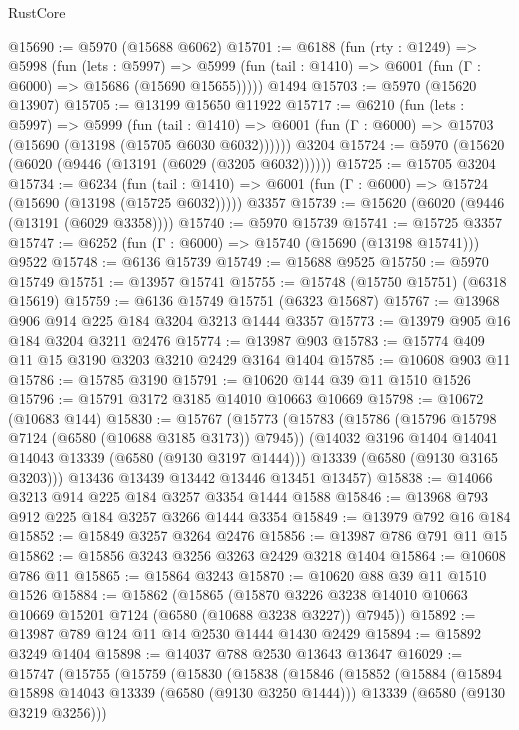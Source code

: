 \begin{lexlean}{RustCore}
\begin{coremodule}
{\begin{coremodule}
{{{{{{{{{{{{{{{{{{{{{{{{{{{{{{{{{{{{{{{{{{{{{@15690 := @5970 (@15688 @6062)
@15701 := @6188
    (fun (rty : @1249) =>
    @5998
      (fun (lets : @5997) =>
      @5999 (fun (tail : @1410) => @6001 (fun (Γ : @6000) => @15686 (@15690 @15655)))))
    @1494
@15703 := @5970 (@15620 @13907)
@15705 := @13199 @15650 @11922
@15717 := @6210
    (fun (lets : @5997) =>
    @5999
      (fun (tail : @1410) =>
      @6001 (fun (Γ : @6000) => @15703 (@15690 (@13198 (@15705 @6030 @6032))))))
    @3204
@15724 := @5970 (@15620 (@6020 (@9446 (@13191 (@6029 (@3205 @6032))))))
@15725 := @15705 @3204
@15734 := @6234
    (fun (tail : @1410) => @6001 (fun (Γ : @6000) => @15724 (@15690 (@13198 (@15725 @6032)))))
    @3357
@15739 := @15620 (@6020 (@9446 (@13191 (@6029 @3358))))
@15740 := @5970 @15739
@15741 := @15725 @3357
@15747 := @6252 (fun (Γ : @6000) => @15740 (@15690 (@13198 @15741))) @9522
@15748 := @6136 @15739
@15749 := @15688 @9525
@15750 := @5970 @15749
@15751 := @13957 @15741
@15755 := @15748 (@15750 @15751) (@6318 @15619)
@15759 := @6136 @15749 @15751 (@6323 @15687)
@15767 := @13968 @906 @914 @225 @184 @3204 @3213 @1444 @3357
@15773 := @13979 @905 @16 @184 @3204 @3211 @2476
@15774 := @13987 @903
@15783 := @15774 @409 @11 @15 @3190 @3203 @3210 @2429 @3164 @1404
@15785 := @10608 @903 @11
@15786 := @15785 @3190
@15791 := @10620 @144 @39 @11 @1510 @1526
@15796 := @15791 @3172 @3185 @14010 @10663 @10669
@15798 := @10672 (@10683 @144)
@15830 := @15767
    (@15773
      (@15783
        (@15786 (@15796 @15798 @7124 (@6580 (@10688 @3185 @3173)) @7945))
        (@14032 @3196 @1404 @14041 @14043 @13339 (@6580 (@9130 @3197 @1444)))
        @13339
        (@6580 (@9130 @3165 @3203)))
      @13436
      @13439
      @13442
      @13446
      @13451
      @13457)
@15838 := @14066 @3213 @914 @225 @184 @3257 @3354 @1444 @1588
@15846 := @13968 @793 @912 @225 @184 @3257 @3266 @1444 @3354
@15849 := @13979 @792 @16 @184
@15852 := @15849 @3257 @3264 @2476
@15856 := @13987 @786 @791 @11 @15
@15862 := @15856 @3243 @3256 @3263 @2429 @3218 @1404
@15864 := @10608 @786 @11
@15865 := @15864 @3243
@15870 := @10620 @88 @39 @11 @1510 @1526
@15884 := @15862
    (@15865
      (@15870 @3226 @3238 @14010 @10663 @10669 @15201 @7124 (@6580 (@10688 @3238 @3227)) @7945))
@15892 := @13987 @789 @124 @11 @14 @2530 @1444 @1430 @2429
@15894 := @15892 @3249 @1404
@15898 := @14037 @788 @2530 @13643 @13647
@16029 := @15747
    (@15755
      (@15759
        (@15830
          (@15838
            (@15846
              (@15852
                (@15884
                  (@15894 @15898 @14043 @13339 (@6580 (@9130 @3250 @1444)))
                  @13339
                  (@6580 (@9130 @3219 @3256)))
}}}}}}}}}}}}}}}}}}}}}}}}}}}}}}}}}}}}}}}}}}}}}
\end{coremodule}}
\end{coremodule}
\end{lexlean}
